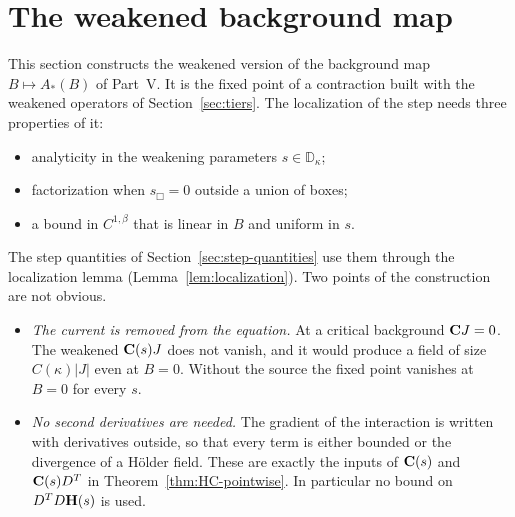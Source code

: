 \section{The weakened background map}\label{sec:weak-background}

This section constructs the weakened version of the background map $B\mapsto A_*(B)$ of Part~V. It is the fixed point of a contraction built with the weakened operators of Section~\ref{sec:tiers}. The localization of the step needs three properties of it:
\begin{itemize}
\item analyticity in the weakening parameters $s\in\mathbb D_\kappa$;
\item factorization when $s_\Box=0$ outside a union of boxes;
\item a bound in $C^{1,\beta}$ that is linear in $B$ and uniform in $s$.
\end{itemize}
The step quantities of Section~\ref{sec:step-quantities} use them through the localization lemma (Lemma~\ref{lem:localization}). Two points of the construction are not obvious.
\begin{itemize}
\item \emph{The current is removed from the equation.} At a critical background $\mathbf C J=0$. The weakened $\mathbf C(s)J$ does not vanish, and it would produce a field of size $C(\kappa)|J|$ even at $B=0$. Without the source the fixed point vanishes at $B=0$ for every $s$.
\item \emph{No second derivatives are needed.} The gradient of the interaction is written with derivatives outside, so that every term is either bounded or the divergence of a H\"older field. These are exactly the inputs of $\mathbf C(s)$ and $\mathbf C(s)D^T$ in Theorem~\ref{thm:HC-pointwise}. In particular no bound on $D^TD\mathbf H(s)$ is used.
\end{itemize}

